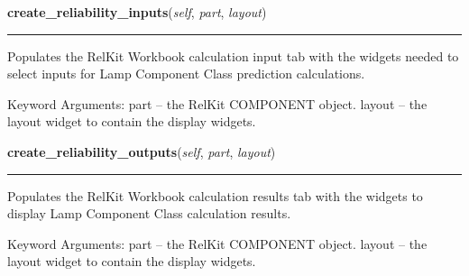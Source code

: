     \label{reliafree:miscellaneous:lamp:Lamp:create_reliability_inputs}

    \vspace{0.5ex}

\hspace{.8\funcindent}\begin{boxedminipage}{\funcwidth}

    \raggedright \textbf{create\_reliability\_inputs}(\textit{self}, \textit{part}, \textit{layout})

    \vspace{-1.5ex}

    \rule{\textwidth}{0.5\fboxrule}
\setlength{\parskip}{2ex}
    Populates the RelKit Workbook calculation input tab with the widgets
    needed to select inputs for Lamp Component Class prediction 
    calculations.

    Keyword Arguments: part   -- the RelKit COMPONENT object. layout -- 
    the layout widget to contain the display widgets.

\setlength{\parskip}{1ex}
    \end{boxedminipage}

    \label{reliafree:miscellaneous:lamp:Lamp:create_reliability_outputs}

    \vspace{0.5ex}

\hspace{.8\funcindent}\begin{boxedminipage}{\funcwidth}

    \raggedright \textbf{create\_reliability\_outputs}(\textit{self}, \textit{part}, \textit{layout})

    \vspace{-1.5ex}

    \rule{\textwidth}{0.5\fboxrule}
\setlength{\parskip}{2ex}
    Populates the RelKit Workbook calculation results tab with the 
    widgets to display Lamp Component Class calculation results.

    Keyword Arguments: part   -- the RelKit COMPONENT object. layout -- 
    the layout widget to contain the display widgets.

\setlength{\parskip}{1ex}
    \end{boxedminipage}

